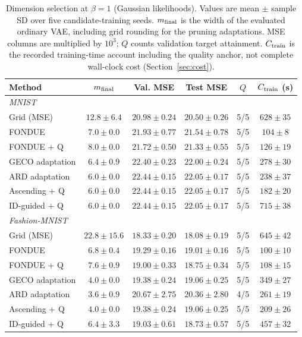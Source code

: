 \documentclass[make,article,submit,pdftex,moreauthors]{Definitions/mdpi}
\begin{document}
\begin{table}[H]
\caption{Dimension selection at $\beta=1$ (Gaussian likelihoods). Values are mean $\pm$ sample SD over five candidate-training seeds. $m_{\rm final}$ is the width of the evaluated ordinary VAE, including grid rounding for the pruning adaptations. MSE columns are multiplied by $10^3$; $Q$ counts validation target attainment. $C_{\rm train}$ is the recorded training-time account including the quality anchor, not complete wall-clock cost (Section~\ref{sec:cost}).}\label{tab:main1}
\footnotesize
\setlength{\tabcolsep}{3.5pt}
\begin{tabular*}{\textwidth}{@{\extracolsep{\fill}}lccccc@{}}
\toprule
Method & $m_{\rm final}$ & Val. MSE & Test MSE & $Q$ & $C_{\rm train}$ (s) \\
\midrule
\multicolumn{6}{l}{\emph{MNIST}} \\
Grid (MSE) & $12.8 \pm 6.4$ & $20.98 \pm 0.24$ & $20.50 \pm 0.26$ & 5/5 & $628 \pm 35$ \\
FONDUE & $7.0 \pm 0.0$ & $21.93 \pm 0.77$ & $21.54 \pm 0.78$ & 5/5 & $104 \pm 8$ \\
FONDUE + Q & $8.0 \pm 0.0$ & $21.72 \pm 0.50$ & $21.33 \pm 0.55$ & 5/5 & $126 \pm 19$ \\
GECO adaptation & $6.4 \pm 0.9$ & $22.40 \pm 0.23$ & $22.00 \pm 0.24$ & 5/5 & $278 \pm 30$ \\
ARD adaptation & $6.0 \pm 0.0$ & $22.44 \pm 0.15$ & $22.05 \pm 0.17$ & 5/5 & $238 \pm 37$ \\
Ascending + Q & $6.0 \pm 0.0$ & $22.44 \pm 0.15$ & $22.05 \pm 0.17$ & 5/5 & $182 \pm 20$ \\
ID-guided + Q & $6.0 \pm 0.0$ & $22.44 \pm 0.15$ & $22.05 \pm 0.17$ & 5/5 & $715 \pm 38$ \\
\midrule
\multicolumn{6}{l}{\emph{Fashion-MNIST}} \\
Grid (MSE) & $22.8 \pm 15.6$ & $18.33 \pm 0.20$ & $18.08 \pm 0.19$ & 5/5 & $645 \pm 42$ \\
FONDUE & $6.8 \pm 0.4$ & $19.29 \pm 0.16$ & $19.01 \pm 0.16$ & 5/5 & $100 \pm 10$ \\
FONDUE + Q & $7.6 \pm 0.9$ & $19.00 \pm 0.33$ & $18.75 \pm 0.34$ & 5/5 & $108 \pm 15$ \\
GECO adaptation & $4.0 \pm 0.0$ & $19.38 \pm 0.24$ & $19.06 \pm 0.25$ & 5/5 & $349 \pm 27$ \\
ARD adaptation & $3.6 \pm 0.9$ & $20.67 \pm 2.75$ & $20.36 \pm 2.80$ & 4/5 & $261 \pm 19$ \\
Ascending + Q & $4.0 \pm 0.0$ & $19.38 \pm 0.24$ & $19.06 \pm 0.25$ & 5/5 & $209 \pm 26$ \\
ID-guided + Q & $6.4 \pm 3.3$ & $19.03 \pm 0.61$ & $18.73 \pm 0.57$ & 5/5 & $457 \pm 32$ \\
\bottomrule
\end{tabular*}
\end{table}
\end{document}

